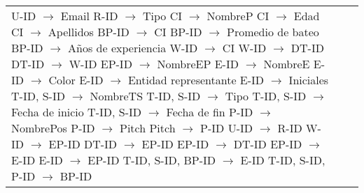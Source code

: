 \documentclass{report}
\begin{document}
\begin{tabularx}{\textwidth}{|X|X|X|}
        U-ID $\rightarrow$ Email \newline 
        R-ID $\rightarrow$ Tipo \newline 
        CI $\rightarrow$ NombreP \newline 
        CI $\rightarrow$ Edad \newline 
        CI $\rightarrow$ Apellidos \newline 
        BP-ID $\rightarrow$ CI \newline 
        BP-ID $\rightarrow$ Promedio de bateo \newline 
        BP-ID $\rightarrow$ Años de experiencia \newline 
        W-ID $\rightarrow$ CI \newline 
        W-ID $\rightarrow$ DT-ID \newline 
        DT-ID $\rightarrow$ W-ID \newline 
        EP-ID $\rightarrow$ NombreEP \newline 
        E-ID $\rightarrow$ NombreE \newline 
        E-ID $\rightarrow$ Color \newline 
        E-ID $\rightarrow$ Entidad representante \newline 
        E-ID $\rightarrow$ Iniciales \newline 
        T-ID, S-ID $\rightarrow$ NombreTS \newline 
        T-ID, S-ID $\rightarrow$ Tipo \newline 
        T-ID, S-ID $\rightarrow$ Fecha de inicio \newline 
        T-ID, S-ID $\rightarrow$ Fecha de fin \newline 
        P-ID $\rightarrow$ NombrePos \newline 
        P-ID $\rightarrow$ Pitch \newline 
        Pitch $\rightarrow$ P-ID \newline 
        U-ID $\rightarrow$ R-ID \newline 
        W-ID $\rightarrow$ EP-ID \newline 
        DT-ID $\rightarrow$ EP-ID \newline 
        EP-ID $\rightarrow$ DT-ID \newline 
        EP-ID $\rightarrow$ E-ID \newline 
        E-ID $\rightarrow$ EP-ID \newline 
        T-ID, S-ID, BP-ID $\rightarrow$ E-ID \newline 
        T-ID, S-ID, P-ID $\rightarrow$ BP-ID \newline 

\end{tabularx}
\end{document}
